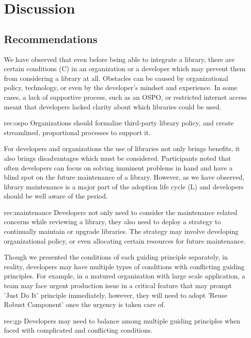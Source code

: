 
\section{Discussion}

\subsection{Recommendations}

We have observed that even before being able to integrate a library, there are certain conditions (C) in an organization or a developer which may prevent them from considering a library at all. Obstacles can be caused by organizational policy, technology, or even by the developer's mindset and experience. In some cases, a lack of supportive process, such as an OSPO, or restricted internet access meant that developers lacked clarity about which libraries could be used. 
\begin{recommendation}{rec:ospo}
  {Organizations should formalize third-party library policy, and create streamlined, proportional processes to support it.}
\end{recommendation}\medskip

For developers and organizations the use of libraries not only brings benefits, it also brings disadvantages which must be considered. Participants noted that often developers can focus on solving imminent problems in hand and have a blind spot on the future maintenance of a library. However, as we have observed, library maintenance is a major part of the adoption life cycle (L) and developers should be well aware of the  period. 
\begin{recommendation}{rec:maintenance}
  {Developers not only need to consider the maintenance related concerns while reviewing a library, they also need to deploy a strategy to continually maintain or upgrade libraries. The strategy may involve developing organizational policy, or even allocating certain resources for future maintenance.}
\end{recommendation}\medskip

Though we presented the conditions of each guiding principle separately, in reality, developers may have multiple types of conditions with conflicting guiding principles. For example, in a matured organization with large scale application, a team may face urgent production issue in a critical feature that may prompt 'Just Do It' principle immediately, however, they will need to adopt 'Reuse Robust Component' once the urgency is taken care of. %
\begin{recommendation}{rec:gp}
Developers may need to balance among multiple guiding principles when faced with complicated and conflicting conditions. 
\end{recommendation}\medskip

